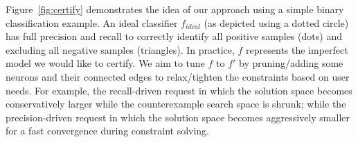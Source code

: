 
Figure~\ref{fig:certify} demonstrates the idea of our approach using a simple binary classification example.
An ideal classifier $f_{ideal}$ (as depicted using a dotted circle) has full precision and recall to correctly identify all positive samples (dots) and excluding all negative samples (triangles).
In practice, ${f}$ represents the imperfect model we would like to certify.
We aim to tune ${f}$ to $f'$ by pruning/adding some neurons and their connected edges to relax/tighten the constraints based on user needs. For example, the recall-driven request in which the solution space becomes conservatively larger while the counterexample search space is shrunk; while the precision-driven request in which the solution space becomes aggressively smaller for a fast convergence during constraint solving. 

